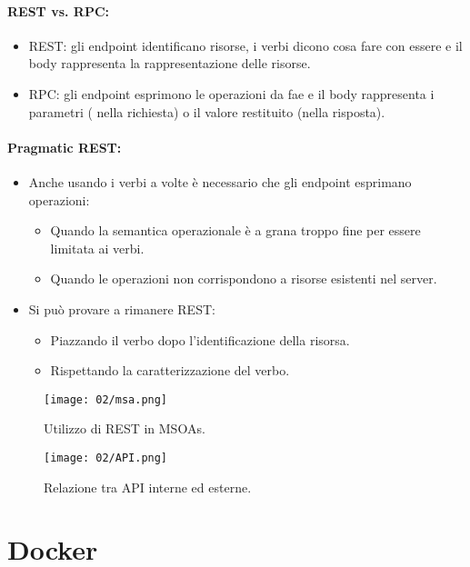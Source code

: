 \paragraph{REST vs. RPC:}

\begin{itemize}
	\item REST: gli endpoint identificano risorse, i verbi dicono cosa fare con essere e il body rappresenta la rappresentazione delle risorse.
	\item RPC: gli endpoint esprimono le operazioni da fae e il body rappresenta i parametri ( nella richiesta) o il valore restituito (nella risposta).
\end{itemize}

\paragraph{Pragmatic REST:}

\begin{itemize}
	\item Anche usando i verbi a volte è necessario che gli endpoint esprimano operazioni:
	      \begin{itemize}
		      \item Quando la semantica operazionale è a grana  troppo fine per essere limitata ai verbi. 
		      \item Quando le operazioni non corrispondono a risorse esistenti nel server.
	      \end{itemize}
      \item Si può provare a rimanere REST:
	      \begin{itemize}
		      \item Piazzando il verbo dopo l'identificazione della risorsa. 
		      \item Rispettando la caratterizzazione del verbo.
	      \end{itemize}
\end{itemize}


\begin{figure}[h]
	\centering
	\texttt{[image: 02/msa.png]}
	\caption{Utilizzo di REST in MSOAs.}
\end{figure}




\begin{figure}[h]
	\centering
	\texttt{[image: 02/API.png]}
	\caption{Relazione tra API interne ed esterne.}
\end{figure}

\section{Docker}








